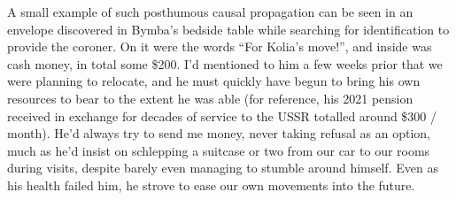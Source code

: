 \documentclass[twoside,10pt]{article}
\begin{document}
\begin{article*}
A small example of such posthumous causal propagation can be seen in an envelope discovered in Bymba’s bedside table while searching for identification to provide the coroner. On it were the words “For Kolia’s move!”, and inside was cash money, in total some \$200. I’d mentioned to him a few weeks prior that we were planning to relocate, and he must quickly have begun to bring his own resources to bear to the extent he was able (for reference, his 2021 pension received in exchange for decades of service to the USSR totalled around \$300 / month). He’d always try to send me money, never taking refusal as an option, much as he’d insist on schlepping a suitcase or two from our car to our rooms during visits, despite barely even managing to stumble around himself. Even as his health failed him, he strove to ease our own movements into the future.

\end{article*}
\end{document}
